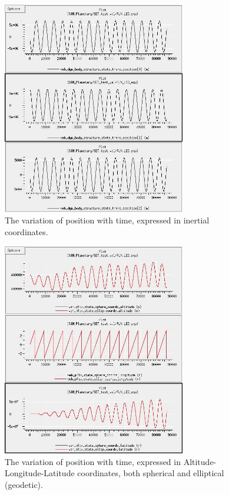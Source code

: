 \begin{description}
\begin{enumerate}
\begin{figure}[!ht]
  \begin{center}
        \includegraphics[width=80mm]{figures/planetary_leo_equ_inrtl.jpg}
        \caption{The variation of position with time, expressed in inertial coordinates.} 
        \label{fig:planetaryleoequinrtl}
  \end{center}
\end{figure}

\begin{figure}[!ht]
  \begin{center}
        \includegraphics[width=80mm]{figures/planetary_leo_equ_lal.jpg}
        \caption{The variation of position with time, expressed in Altitude-Longitude-Latitude coordinates, both spherical and elliptical (geodetic).} 
        \label{fig:planetaryleoequlal}
  \end{center}
\end{figure}


\end{enumerate}
\end{description}
